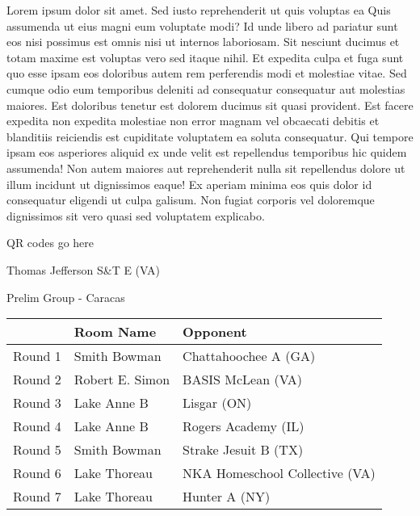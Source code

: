 \documentclass{article}%
\begin{document}
\vspace*{8pt}%
\linebreak%
\newline%
\newline%
Lorem ipsum dolor sit amet. Sed iusto reprehenderit ut quis voluptas ea Quis assumenda ut eius magni eum voluptate modi? Id unde libero ad pariatur sunt eos nisi possimus est omnis nisi ut internos laboriosam. Sit nesciunt ducimus et totam maxime est voluptas vero sed itaque nihil. Et expedita culpa et fuga sunt quo esse ipsam eos doloribus autem rem perferendis modi et molestiae vitae.\newline%
\newline%
Sed cumque odio eum temporibus deleniti ad consequatur consequatur aut molestias maiores. Est doloribus tenetur est dolorem ducimus sit quasi provident. Est facere expedita non expedita molestiae non error magnam vel obcaecati debitis et blanditiis reiciendis est cupiditate voluptatem ea soluta consequatur. Qui tempore ipsam eos asperiores aliquid ex unde velit est repellendus temporibus hic quidem assumenda!\newline%
\newline%
Non autem maiores aut reprehenderit nulla sit repellendus dolore ut illum incidunt ut dignissimos eaque! Ex aperiam minima eos quis dolor id consequatur eligendi ut culpa galisum. Non fugiat corporis vel doloremque dignissimos sit vero quasi sed voluptatem explicabo.\newline%
\newline%
%
\vspace*{30pt}%
\begin{center}%
\begin{Huge}%
QR codes go here%
\end{Huge}%
\end{center}%
\newpage%
%
\begin{center}%
\begin{Huge}%
Thomas Jefferson S\&T E (VA)%
\end{Huge}%
\vspace*{8pt}%
\linebreak%
\begin{Large}%
Prelim Group {-} Caracas%
\end{Large}%
\end{center}%
\begin{tabularx}{\textwidth}{|c|Y|Y|}%
\hline%
&Room Name&Opponent\\%
\hline%
Round 1&Smith Bowman&Chattahoochee A (GA)\\%
Round 2&Robert E. Simon&BASIS McLean (VA)\\%
Round 3&Lake Anne B&Lisgar (ON)\\%
Round 4&Lake Anne B&Rogers Academy (IL)\\%
Round 5&Smith Bowman&Strake Jesuit B (TX)\\%
Round 6&Lake Thoreau&NKA Homeschool Collective (VA)\\%
Round 7&Lake Thoreau&Hunter A (NY)\\%
\hline%
\end{tabularx}%
\end{document}
